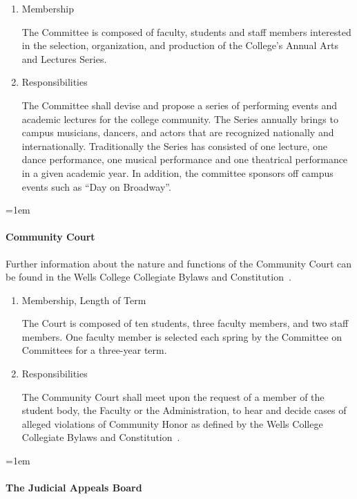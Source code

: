 \documentclass{manual}
\newcommand{\constitution}{Wells College Collegiate Bylaws and Constitution~}
\let\oldparagraph\paragraph
\renewcommand\paragraph{\leftskip=1em\oldparagraph}
\newcommand{\itemLevelA}{\alph*.}
\newcommand{\itemRefA}{\alph*}
\begin{document}
\begin{enumerate}[label=\itemLevelA,ref=\itemRefA]
\item Membership

The Committee is composed of faculty, students and staff members interested in the selection, organization, and production of the College's Annual Arts and Lectures Series.
\item Responsibilities

The Committee shall devise and propose a series of performing events and academic lectures for the college community. The Series annually brings to campus musicians, dancers, and actors that are recognized nationally and internationally. Traditionally the Series has consisted of one lecture, one dance performance, one musical performance and one theatrical performance in a given academic year. In addition, the committee sponsors off campus events such as ``Day on Broadway''.

\end{enumerate}

\paragraph{Community Court}

Further information about the nature and functions of the Community Court can be found in the \constitution.
\begin{enumerate}[label=\itemLevelA,ref=\itemRefA]
\item Membership, Length of Term

The Court is composed of ten students, three faculty members, and two staff members. One faculty member is selected each spring by the Committee on Committees for a three-year term.
\item Responsibilities

The Community Court shall meet upon the request of a member of the student body, the Faculty or the Administration, to hear and decide cases of alleged violations of Community Honor as defined by the \constitution.
\end{enumerate}

\paragraph{The Judicial Appeals Board}
\end{document}
